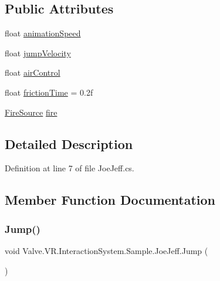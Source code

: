 \subsection*{Public Attributes}
\begin{DoxyCompactItemize}
\item 
float \mbox{\hyperlink{class_valve_1_1_v_r_1_1_interaction_system_1_1_sample_1_1_joe_jeff_a63c01ac5c2ef1901e6ef9eda1378d4a5}{animation\+Speed}}
\item 
float \mbox{\hyperlink{class_valve_1_1_v_r_1_1_interaction_system_1_1_sample_1_1_joe_jeff_ad893033ab5e6be7e1db32c979a98b1cc}{jump\+Velocity}}
\item 
float \mbox{\hyperlink{class_valve_1_1_v_r_1_1_interaction_system_1_1_sample_1_1_joe_jeff_a20f121b435b12ab5b459a76900ca6d0b}{air\+Control}}
\item 
float \mbox{\hyperlink{class_valve_1_1_v_r_1_1_interaction_system_1_1_sample_1_1_joe_jeff_a9a92de4ee6bf42d269b993af94226893}{friction\+Time}} = 0.\+2f
\item 
\mbox{\hyperlink{class_valve_1_1_v_r_1_1_interaction_system_1_1_fire_source}{Fire\+Source}} \mbox{\hyperlink{class_valve_1_1_v_r_1_1_interaction_system_1_1_sample_1_1_joe_jeff_abc6273f87fc83f6a4bb8b23b587c272c}{fire}}
\end{DoxyCompactItemize}


\subsection{Detailed Description}


Definition at line 7 of file Joe\+Jeff.\+cs.



\subsection{Member Function Documentation}
\mbox{\label{class_valve_1_1_v_r_1_1_interaction_system_1_1_sample_1_1_joe_jeff_a1b6528311050c8005057adbf4a0d7cb7}} 
\subsubsection{\texorpdfstring{Jump()}{Jump()}}
{\footnotesize\ttfamily void Valve.\+V\+R.\+Interaction\+System.\+Sample.\+Joe\+Jeff.\+Jump (\begin{DoxyParamCaption}{ }\end{DoxyParamCaption})}



